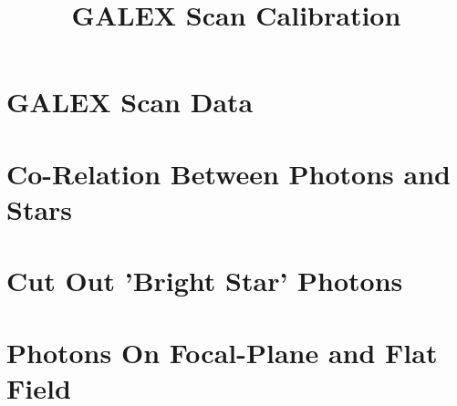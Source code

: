 \documentclass[]{article}
\begin{document}
\title{GALEX Scan Calibration}
\date{}
\maketitle

\section{GALEX Scan Data}

\section{Co-Relation Between Photons and Stars}

\section{Cut Out 'Bright Star' Photons}

\section{Photons On Focal-Plane and Flat Field}
\end{document}
